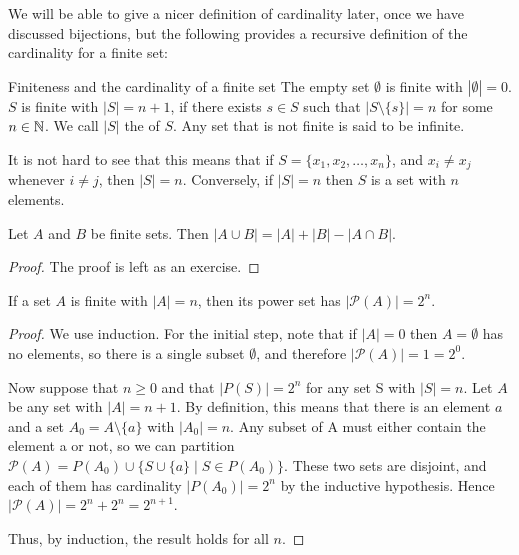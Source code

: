 We will be able to give a nicer definition of cardinality later, once we have discussed bijections, but the following provides a recursive definition of the cardinality for a finite set:

\begin{defn}{Finiteness and the cardinality of a finite set}{}
The empty set $\emptyset$ is
finite with $|\emptyset|=0$. $S$ is finite with $|S|= n+1$, if there exists $s \in S$ such that $|S\setminus \{s\}| = n$ for some $n \in \mathbb N$. We call $|S|$ the  of $S$. Any set that is not finite is said to be infinite.
\end{defn}

It is not hard to see that this means that if $S = \{x_1,x_2,\dots,x_n\}$, and $x_i \neq x_j$ whenever $i \neq j$, then $|S| = n$. Conversely, if $|S| = n$ then $S$ is a set with $n$ elements.

\begin{proposition}
Let $A$ and $B$ be finite sets. Then $|A \cup B| = |A| + |B| - |A \cap B|$.
\end{proposition}

\begin{proof}
The proof is left as an exercise.
\end{proof}

\begin{proposition}
If a set $A$ is finite with $|A| = n$, then its power set has $|\mathcal{P}(A)| = 2^n$.
\end{proposition}

\begin{proof}
We use induction. For the initial step, note that if $|A| = 0$ then $A = \emptyset$ has no elements, so there is a single subset $\emptyset$, and therefore $|\mathcal{P}(A)| = 1 = 2^0$.

Now suppose that $n \ge 0$ and that $|P(S)| = 2^n$ for any set S with $|S| = n$. Let $A$ be any set with $|A| = n+1$. By definition, this means that there is an element $a$ and a set $A_0 = A\setminus\{a\}$ with $|A_0| = n$. Any subset of A must either contain the element a or not, so we can partition $\mathcal{P}(A) = P(A_0) \cup \{S \cup \{a\} \mid S \in P(A_0)\}$. These two sets are disjoint, and each of them has cardinality $|P(A_0)| = 2^n$ by the inductive hypothesis. Hence $|\mathcal{P}(A)| = 2^n + 2^n = 2^{n+1}$.

Thus, by induction, the result holds for all $n$.
\end{proof}

